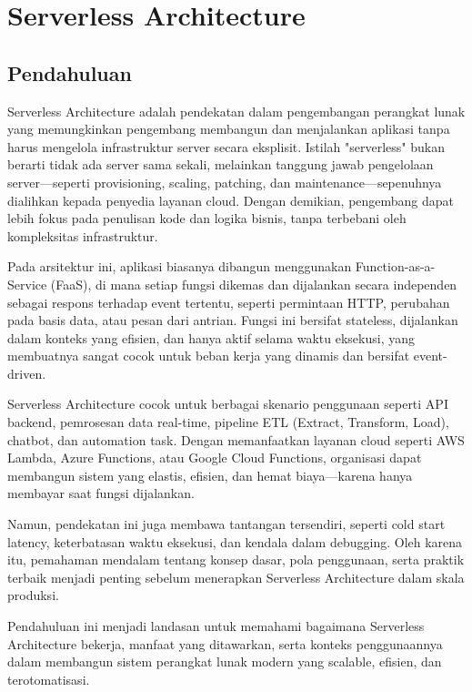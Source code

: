 \chapter{Serverless Architecture}

\section{Pendahuluan}

Serverless Architecture adalah pendekatan dalam pengembangan perangkat lunak yang memungkinkan pengembang membangun dan menjalankan aplikasi tanpa harus mengelola infrastruktur server secara eksplisit. Istilah "serverless" bukan berarti tidak ada server sama sekali, melainkan tanggung jawab pengelolaan server—seperti provisioning, scaling, patching, dan maintenance—sepenuhnya dialihkan kepada penyedia layanan cloud. Dengan demikian, pengembang dapat lebih fokus pada penulisan kode dan logika bisnis, tanpa terbebani oleh kompleksitas infrastruktur.

Pada arsitektur ini, aplikasi biasanya dibangun menggunakan Function-as-a-Service (FaaS), di mana setiap fungsi dikemas dan dijalankan secara independen sebagai respons terhadap event tertentu, seperti permintaan HTTP, perubahan pada basis data, atau pesan dari antrian. Fungsi ini bersifat stateless, dijalankan dalam konteks yang efisien, dan hanya aktif selama waktu eksekusi, yang membuatnya sangat cocok untuk beban kerja yang dinamis dan bersifat event-driven.

Serverless Architecture cocok untuk berbagai skenario penggunaan seperti API backend, pemrosesan data real-time, pipeline ETL (Extract, Transform, Load), chatbot, dan automation task. Dengan memanfaatkan layanan cloud seperti AWS Lambda, Azure Functions, atau Google Cloud Functions, organisasi dapat membangun sistem yang elastis, efisien, dan hemat biaya—karena hanya membayar saat fungsi dijalankan.

Namun, pendekatan ini juga membawa tantangan tersendiri, seperti cold start latency, keterbatasan waktu eksekusi, dan kendala dalam debugging. Oleh karena itu, pemahaman mendalam tentang konsep dasar, pola penggunaan, serta praktik terbaik menjadi penting sebelum menerapkan Serverless Architecture dalam skala produksi.

Pendahuluan ini menjadi landasan untuk memahami bagaimana Serverless Architecture bekerja, manfaat yang ditawarkan, serta konteks penggunaannya dalam membangun sistem perangkat lunak modern yang scalable, efisien, dan terotomatisasi.

